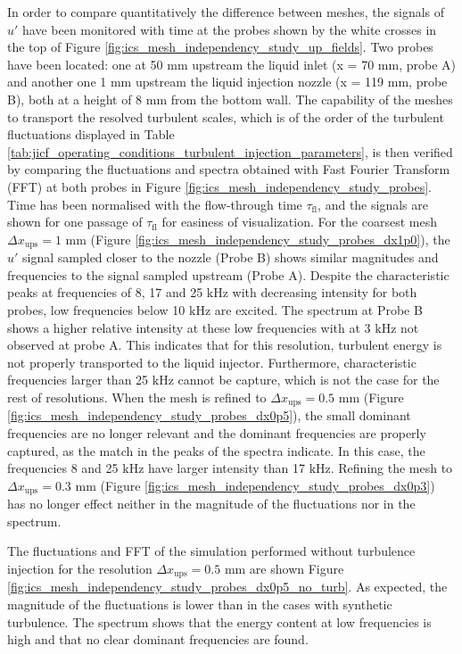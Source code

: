 In order to compare quantitatively the difference between meshes, the signals of $u'$ have been monitored with time at the probes shown by the white crosses in the top of Figure \ref{fig:ics_mesh_independency_study_up_fields}. Two probes have been located: one at 50 mm upstream the liquid inlet (x = 70 mm, probe A) and another one 1 mm upstream the liquid injection nozzle (x = 119 mm, probe B), both at a height of 8 mm from the bottom wall. The capability of the meshes to transport the resolved turbulent scales, which is of the order of the turbulent fluctuations displayed in Table \ref{tab:jicf_operating_conditions_turbulent_injection_parameters}, is then verified by comparing the fluctuations and spectra obtained with Fast Fourier Transform (FFT) at both probes in Figure \ref{fig:ics_mesh_independency_study_probes}. Time has been normalised with the flow-through time $\tau_\mathrm{fl}$, and the signals are shown for one passage of $\tau_\mathrm{fl}$ for easiness of visualization. For the coarsest mesh $\Delta x_\mathrm{ups} = 1$ mm (Figure \ref{fig:ics_mesh_independency_study_probes_dx1p0}), the $u'$ signal sampled closer to the nozzle (Probe B) shows similar magnitudes and frequencies to the signal sampled upstream (Probe A). Despite the characteristic peaks at frequencies of 8, 17 and 25 $\mathrm{kHz}$ with decreasing intensity for both probes, low frequencies below 10 $\mathrm{kHz}$ are excited. The spectrum at Probe B shows a higher relative intensity at these low frequencies with at 3 $\mathrm{kHz}$ not observed at probe A. This indicates that for this resolution, turbulent energy is not properly transported to the liquid injector. Furthermore, characteristic frequencies larger than 25 $\mathrm{kHz}$ cannot be capture, which is not the case for the rest of resolutions. When the mesh is refined to $\Delta x_\mathrm{ups} = 0.5$ mm (Figure \ref{fig:ics_mesh_independency_study_probes_dx0p5}), the small dominant frequencies are no longer relevant and the dominant frequencies are properly captured, as the match in the peaks of the spectra indicate. In this case, the frequencies 8 and 25 $\mathrm{kHz}$ have larger intensity than 17 $\mathrm{kHz}$. Refining the mesh to $\Delta x_\mathrm{ups} = 0.3$ mm (Figure \ref{fig:ics_mesh_independency_study_probes_dx0p3}) has no longer effect neither in the magnitude of the fluctuations nor in the spectrum. 

The fluctuations and FFT of the simulation performed without turbulence injection for the resolution $\Delta x_\mathrm{ups} = 0.5$ mm are shown Figure \ref{fig:ics_mesh_independency_study_probes_dx0p5_no_turb}. As expected, the magnitude of the fluctuations is lower than in the cases with synthetic turbulence. The spectrum shows that the energy content at low frequencies is high and that no clear dominant frequencies are found. \\

